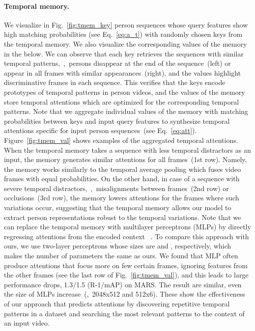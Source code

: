 \documentclass[10pt,twocolumn,letterpaper]{article}
\begin{document}
		\vspace{-0.5cm}
		\paragraph{Temporal memory.}
		
			We visualize in Fig.~\ref{fig:tmem_key} person sequences whose query features  show high matching probabilities (see Eq.~\eqref{eq:a_t}) with randomly chosen keys from the temporal memory. We also visualize the corresponding values of the memory in the below. We can observe that each key retrieves the sequences with similar temporal patterns,~\eg,~persons disappear at the end of the sequence~(left) or appear in all frames with similar appearances~(right), and the values highlight discriminative frames in each sequence. This verifies that the keys encode prototypes of temporal patterns in person videos, and the values of the memory store temporal attentions which are optimized for the corresponding temporal patterns. Note that we aggregate individual values of the memory with matching probabilities between keys and input query features to synthesize temporal attentions specific for input person sequences~(see Eq.~\eqref{eq:att}). Figure~\ref{fig:tmem_val} shows examples of the aggregated temporal attentions. When the temporal memory takes a sequence with less temporal distractors as an input, the memory generates similar attentions for all frames~(1st row). Namely, the memory works similarly to the temporal average pooling which fuses video frames with equal probabilities. On the other hand, in case of a sequence with severe temporal distractors,~\eg,~misalignments between frames~(2nd row) or occlusions~(3rd row), the memory lowers attentions for the frames where such variations occur, suggesting that the temporal memory allows our model to extract person representations robust to the temporal variations. Note that we can replace the temporal memory with multilayer perceptrons (MLPs) by directly regressing attentions from the encoded context ~\cite{li2018diversity}. To compare this approach with ours, we use two-layer perceptrons whose sizes are  and , respectively, which makes the number of parameters the same as ours. We found that MLP often produce attentions that focus more on few certain frames, ignoring features from the other frames (see the last row of Fig.~\ref{fig:tmem_val}), and this leads to large performance drops, 1.3/1.5 (R-1/mAP) on MARS. The result are similar, even the size of MLPs increase~(\eg,~2048x512 and 512x6). These show the effectiveness of our approach that predicts attentions by discovering repetitive temporal patterns in a dataset and searching the most relevant patterns to the context of an input video.
			
\end{document}
